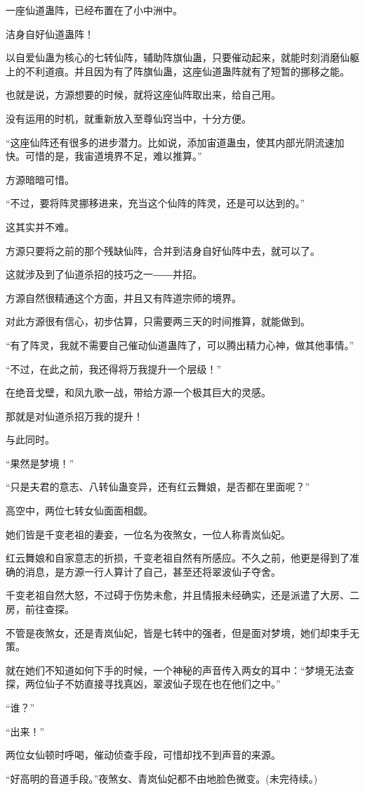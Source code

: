 \begin{this_body}
一座仙道蛊阵，已经布置在了小中洲中。

洁身自好仙道蛊阵！

以自爱仙蛊为核心的七转仙阵，辅助阵旗仙蛊，只要催动起来，就能时刻消磨仙躯上的不利道痕。并且因为有了阵旗仙蛊，这座仙道蛊阵就有了短暂的挪移之能。

也就是说，方源想要的时候，就将这座仙阵取出来，给自己用。

没有运用的时机，就重新放入至尊仙窍当中，十分方便。

“这座仙阵还有很多的进步潜力。比如说，添加宙道蛊虫，使其内部光阴流速加快。可惜的是，我宙道境界不足，难以推算。”

方源暗暗可惜。

“不过，要将阵灵挪移进来，充当这个仙阵的阵灵，还是可以达到的。”

这其实并不难。

方源只要将之前的那个残缺仙阵，合并到洁身自好仙阵中去，就可以了。

这就涉及到了仙道杀招的技巧之一――并招。

方源自然很精通这个方面，并且又有阵道宗师的境界。

对此方源很有信心，初步估算，只需要两三天的时间推算，就能做到。

“有了阵灵，我就不需要自己催动仙道蛊阵了，可以腾出精力心神，做其他事情。”

“不过，在此之前，我还得将万我提升一个层级！”

在绝音戈壁，和凤九歌一战，带给方源一个极其巨大的灵感。

那就是对仙道杀招万我的提升！

与此同时。

“果然是梦境！”

“只是夫君的意志、八转仙蛊变异，还有红云舞娘，是否都在里面呢？”

高空中，两位七转女仙面面相觑。

她们皆是千变老祖的妻妾，一位名为夜煞女，一位人称青岚仙妃。

红云舞娘和自家意志的折损，千变老祖自然有所感应。不久之前，他更是得到了准确的消息，是方源一行人算计了自己，甚至还将翠波仙子夺舍。

千变老祖自然大怒，不过碍于伤势未愈，并且情报未经确实，还是派遣了大房、二房，前往查探。

不管是夜煞女，还是青岚仙妃，皆是七转中的强者，但是面对梦境，她们却束手无策。

就在她们不知道如何下手的时候，一个神秘的声音传入两女的耳中：“梦境无法查探，两位仙子不妨直接寻找真凶，翠波仙子现在也在他们之中。”

“谁？”

“出来！”

两位女仙顿时呼喝，催动侦查手段，可惜却找不到声音的来源。

“好高明的音道手段。”夜煞女、青岚仙妃都不由地脸色微变。(未完待续。)

\end{this_body}

